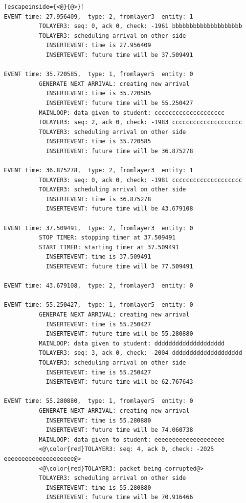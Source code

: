 \documentclass[paper=a4, fontsize=11pt]{scrartcl}
\numberwithin{equation}{section}		%
\numberwithin{figure}{section}			%
\numberwithin{table}{section}				%
\begin{document}
\begin{lstlisting}[escapeinside={<@}{@>}]
EVENT time: 27.956409,  type: 2, fromlayer3  entity: 1
          TOLAYER3: seq: 0, ack 0, check: -1961 bbbbbbbbbbbbbbbbbbbb
          TOLAYER3: scheduling arrival on other side
            INSERTEVENT: time is 27.956409
            INSERTEVENT: future time will be 37.509491

EVENT time: 35.720585,  type: 1, fromlayer5  entity: 0
          GENERATE NEXT ARRIVAL: creating new arrival
            INSERTEVENT: time is 35.720585
            INSERTEVENT: future time will be 55.250427
          MAINLOOP: data given to student: cccccccccccccccccccc
          TOLAYER3: seq: 2, ack 0, check: -1983 cccccccccccccccccccc
          TOLAYER3: scheduling arrival on other side
            INSERTEVENT: time is 35.720585
            INSERTEVENT: future time will be 36.875278

EVENT time: 36.875278,  type: 2, fromlayer3  entity: 1
          TOLAYER3: seq: 0, ack 0, check: -1981 cccccccccccccccccccc
          TOLAYER3: scheduling arrival on other side
            INSERTEVENT: time is 36.875278
            INSERTEVENT: future time will be 43.679108

EVENT time: 37.509491,  type: 2, fromlayer3  entity: 0
          STOP TIMER: stopping timer at 37.509491
          START TIMER: starting timer at 37.509491
            INSERTEVENT: time is 37.509491
            INSERTEVENT: future time will be 77.509491

EVENT time: 43.679108,  type: 2, fromlayer3  entity: 0

EVENT time: 55.250427,  type: 1, fromlayer5  entity: 0
          GENERATE NEXT ARRIVAL: creating new arrival
            INSERTEVENT: time is 55.250427
            INSERTEVENT: future time will be 55.280880
          MAINLOOP: data given to student: dddddddddddddddddddd
          TOLAYER3: seq: 3, ack 0, check: -2004 dddddddddddddddddddd
          TOLAYER3: scheduling arrival on other side
            INSERTEVENT: time is 55.250427
            INSERTEVENT: future time will be 62.767643

EVENT time: 55.280880,  type: 1, fromlayer5  entity: 0
          GENERATE NEXT ARRIVAL: creating new arrival
            INSERTEVENT: time is 55.280880
            INSERTEVENT: future time will be 74.060738
          MAINLOOP: data given to student: eeeeeeeeeeeeeeeeeeee
          <@\color{red}TOLAYER3: seq: 4, ack 0, check: -2025 eeeeeeeeeeeeeeeeeeee@>
          <@\color{red}TOLAYER3: packet being corrupted@>
          TOLAYER3: scheduling arrival on other side
            INSERTEVENT: time is 55.280880
            INSERTEVENT: future time will be 70.916466


\end{lstlisting}
\end{document}
